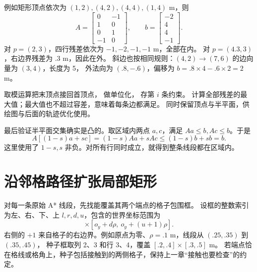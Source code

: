 例如矩形顶点依次为 $(1,2),(4,2),(4,4),(1,4)$ m，则
\begin{equation}
A=\begin{bmatrix}0&-1\\1&0\\0&1\\-1&0\end{bmatrix},\qquad
b=\begin{bmatrix}-2\\4\\4\\-1\end{bmatrix}.
\end{equation}
对 $p=(2,3)$，四行残差依次为 $-1,-2,-1,-1$ m，全部在内。
对 $p=(4.3,3)$，右边界残差为 $.3$ m，因此在外。
斜边也按相同规则：$(4,2)\to(7,6)$ 的边向量为 $(3,4)$，长度为 5，
外法向为 $(.8,-.6)$，偏移为 $b=.8\times4-.6\times2=2$ m。

\par\noindent\begin{minipage}{\linewidth}

\end{minipage}\par
取模运算把末顶点接回首顶点， 做单位化， 存第 $i$ 条约束。
 计算全部残差的最大值；最大值也不超过容差，意味着每条边都满足。
 同时保留顶点与半平面，供绘图与后面的轨迹优化使用。

最后验证半平面交集确实是凸的。取区域内两点 $a,c$，满足 $Aa\leq b,Ac\leq b$。于是
\begin{equation}
A[(1-s)a+sc]=(1-s)Aa+sAc\leq(1-s)b+sb=b.
\end{equation}
这里使用了 $1-s,s$ 非负。对所有行同时成立，就得到整条线段都在区域内。

\section{沿邻格路径扩张局部矩形}
对每一条原始 A* 线段，先找能覆盖其两个端点的格子包围框。
设框的整数索引为左、右、下、上 $l,r,d,u$，包含的世界坐标范围为
\begin{equation}
[o_x+l\rho,\ o_x+(r+1)\rho]\times
[o_y+d\rho,\ o_y+(u+1)\rho].
\end{equation}
右侧的 $+1$ 来自格子的右边界。例如原点为零、$\rho=.1$ m，线段从 $(.25,.35)$ 到 $(.35,.45)$，
种子框取列 2、3 和行 3、4，覆盖 $[.2,.4]\times[.3,.5]$ m。
若端点恰在格线或格角上，种子包括接触到的两侧格子，保持上一章“接触也要检查”的约定。

